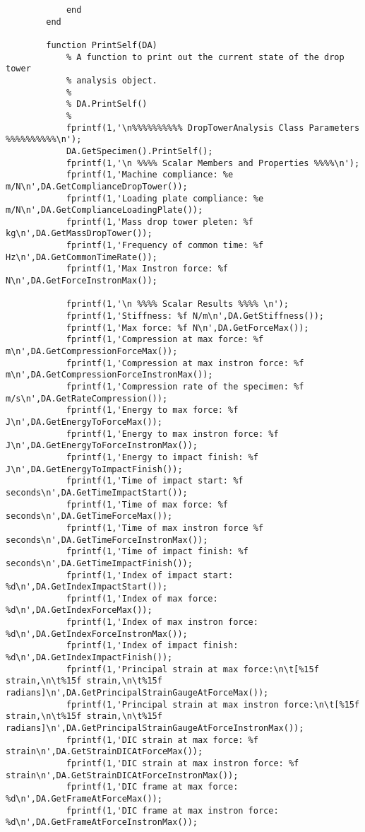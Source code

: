 \begin{lstlisting}
            end
        end
        
        function PrintSelf(DA)
            % A function to print out the current state of the drop tower
            % analysis object.
            %
            % DA.PrintSelf()
            %
            fprintf(1,'\n%%%%%%%%%% DropTowerAnalysis Class Parameters %%%%%%%%%%\n');
            DA.GetSpecimen().PrintSelf();
            fprintf(1,'\n %%%% Scalar Members and Properties %%%%\n');
            fprintf(1,'Machine compliance: %e m/N\n',DA.GetComplianceDropTower());
            fprintf(1,'Loading plate compliance: %e m/N\n',DA.GetComplianceLoadingPlate());
            fprintf(1,'Mass drop tower pleten: %f kg\n',DA.GetMassDropTower());
            fprintf(1,'Frequency of common time: %f Hz\n',DA.GetCommonTimeRate());
            fprintf(1,'Max Instron force: %f N\n',DA.GetForceInstronMax());
                        
            fprintf(1,'\n %%%% Scalar Results %%%% \n');
            fprintf(1,'Stiffness: %f N/m\n',DA.GetStiffness());
            fprintf(1,'Max force: %f N\n',DA.GetForceMax());
            fprintf(1,'Compression at max force: %f m\n',DA.GetCompressionForceMax());
            fprintf(1,'Compression at max instron force: %f m\n',DA.GetCompressionForceInstronMax());
            fprintf(1,'Compression rate of the specimen: %f m/s\n',DA.GetRateCompression());
            fprintf(1,'Energy to max force: %f J\n',DA.GetEnergyToForceMax());
            fprintf(1,'Energy to max instron force: %f J\n',DA.GetEnergyToForceInstronMax());
            fprintf(1,'Energy to impact finish: %f J\n',DA.GetEnergyToImpactFinish());
            fprintf(1,'Time of impact start: %f seconds\n',DA.GetTimeImpactStart());
            fprintf(1,'Time of max force: %f seconds\n',DA.GetTimeForceMax());
            fprintf(1,'Time of max instron force %f seconds\n',DA.GetTimeForceInstronMax());
            fprintf(1,'Time of impact finish: %f seconds\n',DA.GetTimeImpactFinish());
            fprintf(1,'Index of impact start: %d\n',DA.GetIndexImpactStart());
            fprintf(1,'Index of max force: %d\n',DA.GetIndexForceMax());
            fprintf(1,'Index of max instron force: %d\n',DA.GetIndexForceInstronMax());
            fprintf(1,'Index of impact finish: %d\n',DA.GetIndexImpactFinish());
            fprintf(1,'Principal strain at max force:\n\t[%15f strain,\n\t%15f strain,\n\t%15f radians]\n',DA.GetPrincipalStrainGaugeAtForceMax());
            fprintf(1,'Principal strain at max instron force:\n\t[%15f strain,\n\t%15f strain,\n\t%15f radians]\n',DA.GetPrincipalStrainGaugeAtForceInstronMax());
            fprintf(1,'DIC strain at max force: %f strain\n',DA.GetStrainDICAtForceMax());
            fprintf(1,'DIC strain at max instron force: %f strain\n',DA.GetStrainDICAtForceInstronMax());
            fprintf(1,'DIC frame at max force: %d\n',DA.GetFrameAtForceMax());
            fprintf(1,'DIC frame at max instron force: %d\n',DA.GetFrameAtForceInstronMax());


\end{lstlisting}
